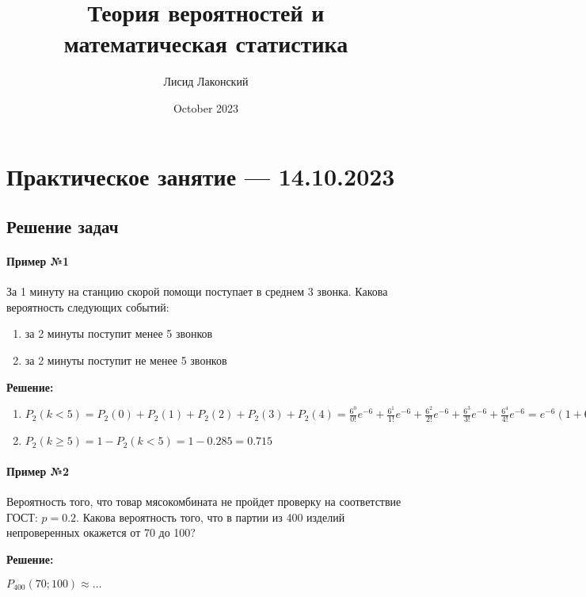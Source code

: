\documentclass{article}
\title{Теория вероятностей и математическая статистика}
\author{Лисид Лаконский}
\date{October 2023}
\begin{document}
\raggedright

\maketitle

\tableofcontents
\pagebreak

\section{Практическое занятие — 14.10.2023}

\subsection{Решение задач}

\paragraph{Пример №1} За 1 минуту на станцию скорой помощи поступает в среднем 3 звонка. Какова вероятность следующих событий:

\begin{enumerate}
    \item за 2 минуты поступит менее 5 звонков
    \item за 2 минуты поступит не менее 5 звонков
\end{enumerate}

\textbf{Решение:}

\begin{enumerate}
    \item $P_{2}(k < 5) = P_{2}(0) + P_2(1) + P_2(2) + P_2(3) + P_2(4) = \frac{6^0}{0!} e^{-6} + \frac{6^1}{1!} e^{-6} + \frac{6^2}{2!} e^{-6} + \frac{6^3}{3!} e^{-6} + \frac{6^4}{4!} e^{-6} = e^{-6} (1 + 6 + 18 + 36 + 54) = \frac{115}{e^6} = 0.285$
    \item $P_2(k \ge 5) = 1 - P_2(k < 5) = 1 - 0.285 = 0.715$
\end{enumerate}

\paragraph{Пример №2} Вероятность того, что товар мясокомбината не пройдет проверку на соответствие ГОСТ: $p = 0.2$. Какова вероятность того, что в партии из 400 изделий непроверенных окажется от 70 до 100?

\textbf{Решение:}

$P_400(70; 100) \approx \dots$
\end{document}
